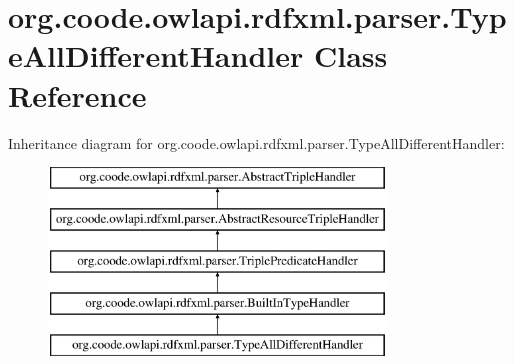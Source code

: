 \hypertarget{classorg_1_1coode_1_1owlapi_1_1rdfxml_1_1parser_1_1_type_all_different_handler}{\section{org.\-coode.\-owlapi.\-rdfxml.\-parser.\-Type\-All\-Different\-Handler Class Reference}
\label{classorg_1_1coode_1_1owlapi_1_1rdfxml_1_1parser_1_1_type_all_different_handler}
}
Inheritance diagram for org.\-coode.\-owlapi.\-rdfxml.\-parser.\-Type\-All\-Different\-Handler\-:\begin{figure}[H]
\begin{center}
\leavevmode
\includegraphics[height=5.000000cm]{classorg_1_1coode_1_1owlapi_1_1rdfxml_1_1parser_1_1_type_all_different_handler}
\end{center}
\end{figure}
